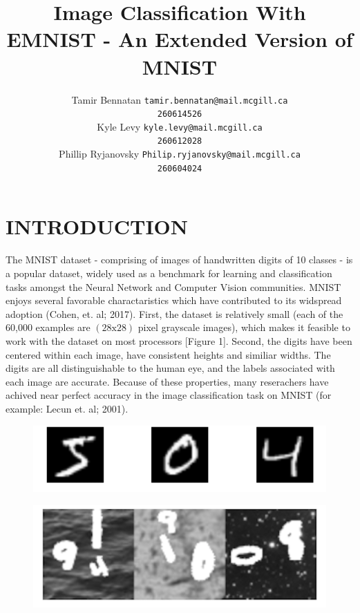\documentclass[letterpaper, 10 pt, conference]{ieeeconf}  %
\title{\LARGE \bf
Image Classification With EMNIST - An Extended Version of MNIST
}
\author{ \parbox{2 in}{\centering Tamir Bennatan
         {\tt\small tamir.bennatan@mail.mcgill.ca\\}
         {\tt\small 260614526}}
         \hspace*{ 0.3 in}
         \parbox{2 in}{\centering Kyle Levy
         {\tt\small kyle.levy@mail.mcgill.ca\\}
         {\tt\small 260612028}}
         \hspace*{0.3 in}
         \parbox{2 in}{\centering Phillip Ryjanovsky
         {\tt\small Philip.ryjanovsky@mail.mcgill.ca\\}
         {\tt\small 260604024}}
}
\begin{document}
\maketitle
\thispagestyle{empty}
\pagestyle{empty}




\section{INTRODUCTION}

The MNIST dataset - comprising of images of handwritten digits of 10 classes - is a popular dataset, widely used as a  benchmark for learning and classification tasks amongst the Neural Network and Computer Vision communities. MNIST enjoys several favorable charactaristics which have contributed to its widspread adoption (Cohen, et. al; 2017). First, the dataset is relatively small (each of the 60,000 examples are $(28\text{x}28)$ pixel grayscale images), which makes it feasible to work with the dataset on most processors [Figure 1]. Second, the digits have been centered within each image, have consistent heights and similiar widths. The digits are all distinguishable to the human eye, and the labels associated with each image are accurate. Because of these properties, many reserachers have achived near perfect accuracy in the image classification task on MNIST (for example: Lecun et. al; 2001).

\begin{figure}[ht]
\centering
\begin{minipage}{.5\textwidth}
  \centering
  \includegraphics[width=1\linewidth]{mnist_sample}
  \label{fig:test1}
\end{minipage}%
\begin{minipage}{.5\textwidth}
  \centering
  \includegraphics[width=1\linewidth]{emnist_sample}
  \label{fig:test2}
\end{minipage}
\end{figure}
\end{document}
